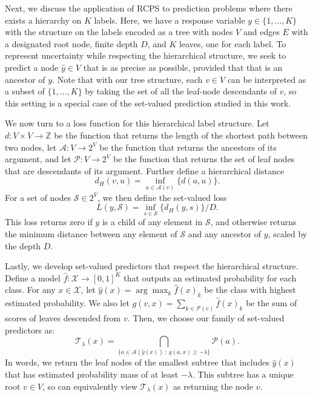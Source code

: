 \documentclass[10pt]{article}
\newcommand{\X}{\mathcal{X}}
\newcommand{\T}{\mathcal{T}}
\renewcommand{\S}{\mathcal{S}}
\begin{document}
Next, we discuss the application of RCPS to prediction problems where there exists a hierarchy on $K$ labels. Here, we have a response variable $y \in \{1,\dots,K\}$ with the structure on the labels encoded as a tree with nodes $V$ and edges $E$ with a designated root node, finite depth $D$, and $K$ leaves, one for each label. To represent uncertainty while respecting the hierarchical structure, we seek to predict a node $\hat{y} \in V$ that is as precise as possible, provided that that is an ancestor of $y$. Note that with our tree structure, each $v \in V$ can be interpreted as a subset of $\{1,\dots,K\}$ by taking the set of all the leaf-node descendants of $v$, so this setting is a special case of the set-valued prediction studied in this work.

We now turn to a loss function for this hierarchical label structure.
Let $d:V \times V \to \mathbb{Z}$ be the function that returns the length of the shortest path between two nodes, let $\mathcal{A}: V \to 2^V$ be the function that returns the ancestors of its argument, and let $\mathcal{P}: V \to 2^V$ be the function that returns the set of leaf nodes that are descendants of its argument. Further define a hierarchical distance 
\begin{equation*}
d_H(v,u) = \underset{a \in \mathcal{A}(v)}{\inf} \{ d(a,u) \}.
\end{equation*}
For a set of nodes $\S \in 2^V$, we then define the set-valued loss 
\begin{equation}
    \label{eq:hierarchical-loss}
    L(y,\S) = \underset{s \in \S}{\inf} \{ d_H(y,s) \} / D.
\end{equation}
This loss returns zero if $y$ is a child of any element in $\S$, and otherwise returns the minimum distance between any element of $\S$ and any ancestor of $y$, scaled by the depth $D$.

Lastly, we develop set-valued predictors that respect the hierarchical structure.
Define a model $\hat{f}:\X \to [0,1]^K$ that outputs an estimated probability for each class.
For any $x \in \X$, let $\hat{y}(x) = \arg\max_{k} \hat{f}(x)_k$ be the class with highest estimated probability.
We also let $g(v,x) = \underset{ k \in \mathcal{P}(v) }{\sum}\hat{f}(x)_k$ be the sum of scores of leaves descended from $v$.
Then, we choose our family of set-valued predictors as:
\begin{equation}
    \label{eq:hierarchical-sets}
    \T_\lambda(x) = \underset{\{a \in \mathcal{A}(\hat{y}(x)) \ : \ g(a,x) \geq -\lambda\}}{\bigcap}  \mathcal{P}(a).
\end{equation}
In words, we return the leaf nodes of the smallest subtree that includes $\hat{y}(x)$ that has estimated probability mass of at least $-\lambda$. This subtree has a unique root $v \in V$, so can equivalently view $\T_\lambda(x)$ as returning the node $v$.
\end{document}
